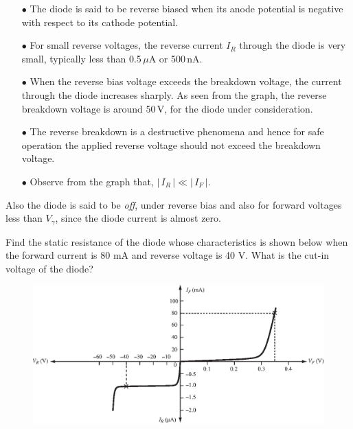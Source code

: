 \begin{itemize}
\item[$\bullet$] The diode is said to be reverse biased when its anode potential is negative with respect to its cathode potential.

\item[$\bullet$] For small reverse voltages, the reverse current $I_{R}$ through the diode is very small, typically less than 0.5\,$\mu$A or 500\,nA.

\item[$\bullet$] When the reverse bias voltage exceeds the breakdown voltage, the current through the diode increases sharply. As seen from the graph, the reverse breakdown voltage is around 50\,V, for the diode under consideration.

\item[$\bullet$] The reverse breakdown is a destructive phenomena and hence for safe operation the applied reverse voltage should not exceed the breakdown voltage.

\item[$\bullet$] Observe from the graph that, $|\,I_{R}\,|\ll |\,I_{F}\,|$.
\end{itemize}

Also the diode is said to be {\em off}, under reverse bias and also for forward voltages less than $V_{\gamma}$, since the diode current is almost zero.

\begin{example}\label{exam1.3}
Find the static resistance of the diode whose characteristics is shown
below when the forward current is 80 mA and reverse voltage is 40
V. What is the cut-in voltage of the diode?
\begin{figure}[H]
\centering
\includegraphics{chap1/S3-EE-01-010.eps}
\end{figure}
\end{example}

